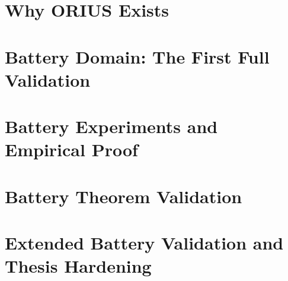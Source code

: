 \documentclass[12pt,oneside]{book}
\begin{document}
\frontmatter



\tableofcontents
\listoftables
\listoffigures

\mainmatter

\part{Why ORIUS Exists}





\part{Battery Domain: The First Full Validation}







\part{Battery Experiments and Empirical Proof}





\part{Battery Theorem Validation}







\part{Extended Battery Validation and Thesis Hardening}







\end{document}
